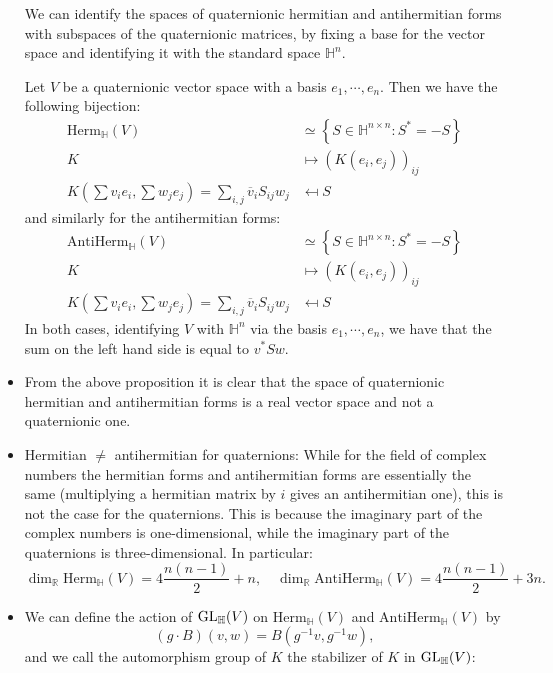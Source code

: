 \documentclass{report}
\begin{document}
\begin{itemize}
\begin{definition}
    \end{definition}
    We can identify the spaces of quaternionic hermitian and antihermitian forms with subspaces of the quaternionic matrices, by fixing a base for the vector space and identifying it with the standard space $\mathbb H^n$.
    \begin{proposition}
        Let $V$ be a quaternionic vector space with a basis $e_1, \cdots, e_n$.
        Then we have the following bijection:
        \begin{align*}
            \mathrm{Herm}_\mathbb H(V) &\simeq \left\{ S \in \mathbb H^{n\times n} : S^* = -S \right\} \\
            K &\mapsto \left(K(e_i, e_j)\right)_{ij} \\
            K\left(\sum v_i e_i , \sum w_j e_j \right) = \sum_{i,j} \overline v_i S_{ij} w_j &\mapsfrom S
        \end{align*}
        and similarly for the antihermitian forms:
        \begin{align*}
            \mathrm{AntiHerm}_\mathbb H(V) &\simeq \left\{ S \in \mathbb H^{n\times n} : S^* = -S \right\} \\
            K &\mapsto \left(K(e_i, e_j)\right)_{ij} \\
            K\left(\sum v_i e_i , \sum w_j e_j \right) = \sum_{i,j} \overline v_i S_{ij} w_j &\mapsfrom S
        \end{align*}
        In both cases, identifying $V$ with $\mathbb H^n$ via the basis $e_1, \cdots, e_n$, we have that the sum on the left hand side is equal to $v^* S w$.
    \end{proposition}
    \item
    From the above proposition it is clear that the space of quaternionic hermitian and antihermitian forms is a real vector space and not a quaternionic one.
    \item Hermitian $\neq$ antihermitian for quaternions:
    While for the field of complex numbers the hermitian forms and antihermitian forms are essentially the same (multiplying a hermitian matrix by $i$ gives an antihermitian one), this is not the case for the quaternions.
    This is because the imaginary part of the complex numbers is one-dimensional, while the imaginary part of the quaternions is three-dimensional.
    In particular:
    \[
    \dim_\mathbb R \mathrm{Herm}_\mathbb H(V) = 4\frac{n(n-1)}{2} + n, \quad
    \dim_\mathbb R \mathrm{AntiHerm}_\mathbb H(V) = 4\frac{n(n-1)}{2} + 3n.
    \]
    \item We can define the action of $\operatorname{{\mathrm{GL}}}_\mathbb H (V)$ on $\mathrm{Herm}_\mathbb H(V)$ and $\mathrm{AntiHerm}_\mathbb H(V)$ by $$(g \cdot B)(v,w) = B(g^{-1}v, g^{-1}w),$$ and we call the automorphism group of $K$ the stabilizer of $K$ in $\operatorname{{\mathrm{GL}}}_\mathbb H(V)$:

\end{itemize}
\end{document}
